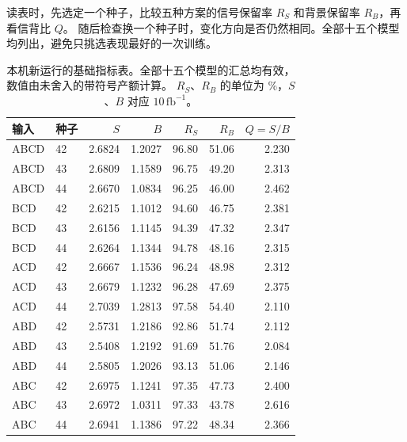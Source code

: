 \documentclass[11pt,a4paper,fontset=fandol,scheme=plain]{ctexart}
\begin{document}
读表时，先选定一个种子，比较五种方案的信号保留率 $R_S$ 和背景保留率 $R_B$，再看信背比 $Q$。
随后检查换一个种子时，变化方向是否仍然相同。全部十五个模型均列出，避免只挑选表现最好的一次训练。
\begin{table}[H]
\caption{本机新运行的基础指标表。全部十五个模型的汇总均有效，数值由未舍入的带符号产额计算。
$R_S$、$R_B$ 的单位为 \%，$S$、$B$ 对应 $10\,\mathrm{fb}^{-1}$。}
\label{tab:basic-all}
\centering\small
\begin{tabular}{llrrrrr}
\toprule
输入 & 种子 & $S$ & $B$ & $R_S$ & $R_B$ & $Q=S/B$ \\
\midrule
ABCD & 42 & 2.6824 & 1.2027 & 96.80 & 51.06 & 2.230 \\
ABCD & 43 & 2.6809 & 1.1589 & 96.75 & 49.20 & 2.313 \\
ABCD & 44 & 2.6670 & 1.0834 & 96.25 & 46.00 & 2.462 \\
\addlinespace
BCD & 42 & 2.6215 & 1.1012 & 94.60 & 46.75 & 2.381 \\
BCD & 43 & 2.6156 & 1.1145 & 94.39 & 47.32 & 2.347 \\
BCD & 44 & 2.6264 & 1.1344 & 94.78 & 48.16 & 2.315 \\
\addlinespace
ACD & 42 & 2.6667 & 1.1536 & 96.24 & 48.98 & 2.312 \\
ACD & 43 & 2.6679 & 1.1232 & 96.28 & 47.69 & 2.375 \\
ACD & 44 & 2.7039 & 1.2813 & 97.58 & 54.40 & 2.110 \\
\addlinespace
ABD & 42 & 2.5731 & 1.2186 & 92.86 & 51.74 & 2.112 \\
ABD & 43 & 2.5408 & 1.2192 & 91.69 & 51.76 & 2.084 \\
ABD & 44 & 2.5805 & 1.2026 & 93.13 & 51.06 & 2.146 \\
\addlinespace
ABC & 42 & 2.6975 & 1.1241 & 97.35 & 47.73 & 2.400 \\
ABC & 43 & 2.6972 & 1.0311 & 97.33 & 43.78 & 2.616 \\
ABC & 44 & 2.6941 & 1.1386 & 97.22 & 48.34 & 2.366 \\
\bottomrule
\end{tabular}
\end{table}
\end{document}
